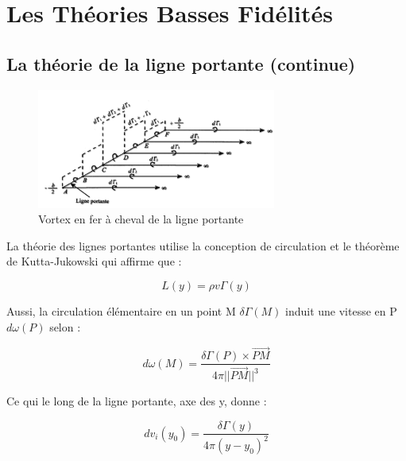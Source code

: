 \chapter{Les Théories Basses Fidélités}
\label{ch:Ch1}

\section{La théorie de la ligne portante (continue)} 
\label{sec:Ch1.1}

\begin{figure}[H]
    \centering
    \includegraphics[width=0.7\textwidth]{Pics/01 - Basses Fidélités/Ligne portante.png}  
    \caption{Vortex en fer à cheval de la ligne portante}
    \label{fig:llt fer à cheval}
\end{figure}

La théorie des lignes portantes utilise la conception de circulation et le théorème de Kutta-Jukowski qui affirme que :

\begin{center}
    \begin{equation}
        L(y) = \rho v \Gamma(y)
        \label{eq:Cl_breukels}
    \end{equation}
\end{center}

Aussi, la circulation élémentaire en un point M $\delta\Gamma(M) $ induit une vitesse en P $d\omega(P) $ selon : 

\begin{center}
    \begin{equation}
        d\omega(M) = \frac{\delta\Gamma(P) \times \overrightarrow{PM}}{4\pi ||\overrightarrow{PM}||^3}
        \label{eq:v induite}
    \end{equation}
\end{center}

Ce qui le long de la ligne portante, axe des y, donne : 

\begin{center}
    \begin{equation}
        dv_i(y_0) = \frac{\delta\Gamma(y)}{4\pi (y-y_0)^2}
        \label{eq:v induite 1d}
    \end{equation}
\end{center}


